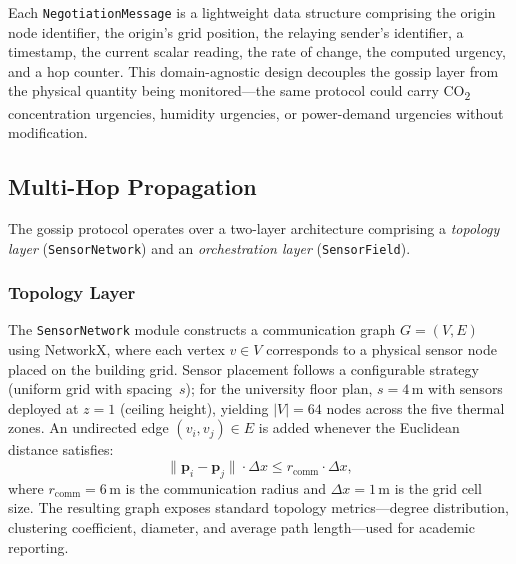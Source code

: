 \documentclass[conference]{IEEEtran}
\begin{document}
Each \texttt{NegotiationMessage} is a lightweight data structure comprising the origin node identifier, the origin's grid position, the relaying sender's identifier, a timestamp, the current scalar reading, the rate of change, the computed urgency, and a hop counter. This domain-agnostic design decouples the gossip layer from the physical quantity being monitored---the same protocol could carry CO\textsubscript{2} concentration urgencies, humidity urgencies, or power-demand urgencies without modification.

\subsection{Multi-Hop Propagation}
The gossip protocol operates over a two-layer architecture comprising a \textit{topology layer} (\texttt{SensorNetwork}) and an \textit{orchestration layer} (\texttt{SensorField}). \\
\subsubsection{\textbf{Topology Layer}} 
The \texttt{SensorNetwork} module constructs a communication graph $G = (V, E)$ using NetworkX, where each vertex $v \in V$ corresponds to a physical sensor node placed on the building grid. Sensor placement follows a configurable strategy (uniform grid with spacing~$s$); for the university floor plan, $s = 4\,\text{m}$ with sensors deployed at $z = 1$ (ceiling height), yielding $|V| = 64$ nodes across the five thermal zones. An undirected edge $(v_i, v_j) \in E$ is added whenever the Euclidean distance satisfies:
\begin{equation}
    \| \mathbf{p}_i - \mathbf{p}_j \| \cdot \Delta x \leq r_{\text{comm}} \cdot \Delta x,
    \label{eq:comm_radius}
\end{equation}
where $r_{\text{comm}} = 6\,\text{m}$ is the communication radius and $\Delta x = 1\,\text{m}$ is the grid cell size. The resulting graph exposes standard topology metrics---degree distribution, clustering coefficient, diameter, and average path length---used for academic reporting.
\end{document}
